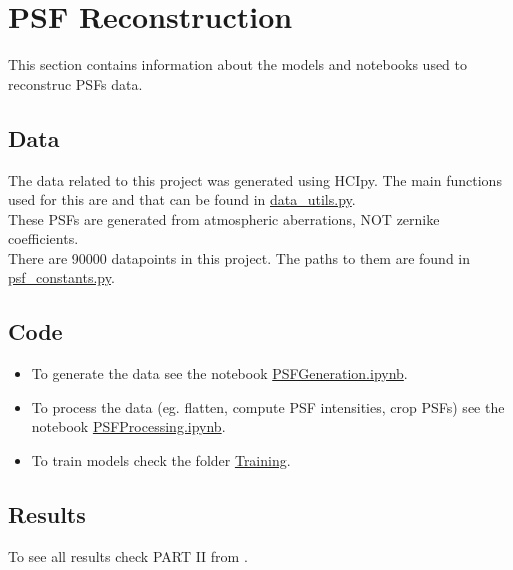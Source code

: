 \section{PSF Reconstruction}
	This section contains information about the models and notebooks used to reconstruc PSFs data.
	
	\subsection{Data}
	
		The data related to this project was generated using HCIpy. The main functions used for this are  and  that can be found in \href{https://github.com/Dacarpe03/PLImageReconstruction/blob/main/Utils/data_utils.py}{data\_utils.py}.\\
		
		These PSFs are generated from atmospheric aberrations, NOT zernike coefficients.\\
		
		There are 90000 datapoints in this project. The paths to them are found in \href{https://github.com/Dacarpe03/PLImageReconstruction/blob/main/Utils/psf_constants.py}{psf\_constants.py}.\\
	
	\subsection{Code}
		\begin{itemize}
			\item To generate the data see the notebook \href{https://github.com/Dacarpe03/PLImageReconstruction/blob/main/PSFReconstruction/DataNotebooks/PSFGeneration.ipynb}{PSFGeneration.ipynb}.
			\item To process the data (eg. flatten, compute PSF intensities, crop PSFs) see the notebook \href{https://github.com/Dacarpe03/PLImageReconstruction/blob/main/PSFReconstruction/DataNotebooks/PSFProcessing.ipynb}{PSFProcessing.ipynb}.
			\item To train models check the folder \href{https://github.com/Dacarpe03/PLImageReconstruction/tree/main/PSFReconstruction/Training}{Training}.
			
		\end{itemize}
	\subsection{Results}
		To see all results check PART II from .
		
